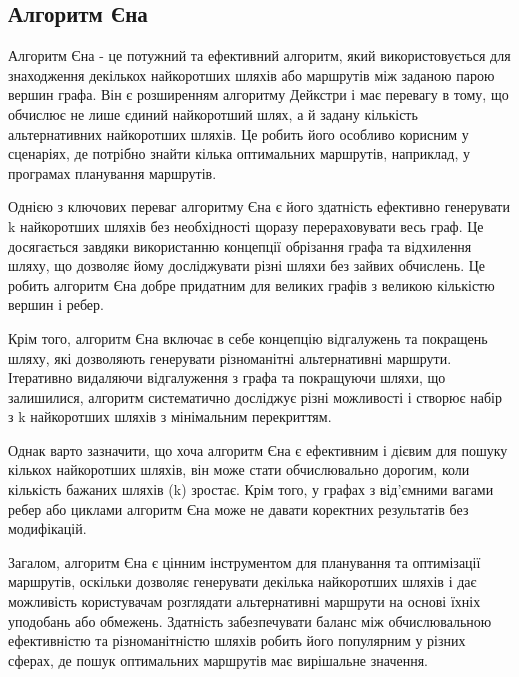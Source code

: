 \subsection{Алгоритм Єна}
\label{subsec:yens-subsection}

Алгоритм Єна - це потужний та ефективний алгоритм, який використовується для знаходження декількох найкоротших шляхів або маршрутів між заданою парою вершин графа. Він є розширенням алгоритму Дейкстри і має перевагу в тому, що обчислює не лише єдиний найкоротший шлях, а й задану кількість альтернативних найкоротших шляхів. Це робить його особливо корисним у сценаріях, де потрібно знайти кілька оптимальних маршрутів, наприклад, у програмах планування маршрутів.

Однією з ключових переваг алгоритму Єна є його здатність ефективно генерувати k найкоротших шляхів без необхідності щоразу перераховувати весь граф. Це досягається завдяки використанню концепції обрізання графа та відхилення шляху, що дозволяє йому досліджувати різні шляхи без зайвих обчислень. Це робить алгоритм Єна добре придатним для великих графів з великою кількістю вершин і ребер.

Крім того, алгоритм Єна включає в себе концепцію відгалужень та покращень шляху, які дозволяють генерувати різноманітні альтернативні маршрути. Ітеративно видаляючи відгалуження з графа та покращуючи шляхи, що залишилися, алгоритм систематично досліджує різні можливості і створює набір з k найкоротших шляхів з мінімальним перекриттям.

Однак варто зазначити, що хоча алгоритм Єна є ефективним і дієвим для пошуку кількох найкоротших шляхів, він може стати обчислювально дорогим, коли кількість бажаних шляхів (k) зростає. Крім того, у графах з від'ємними вагами ребер або циклами алгоритм Єна може не давати коректних результатів без модифікацій.

Загалом, алгоритм Єна є цінним інструментом для планування та оптимізації маршрутів, оскільки дозволяє генерувати декілька найкоротших шляхів і дає можливість користувачам розглядати альтернативні маршрути на основі їхніх уподобань або обмежень. Здатність забезпечувати баланс між обчислювальною ефективністю та різноманітністю шляхів робить його популярним у різних сферах, де пошук оптимальних маршрутів має вирішальне значення.\\

